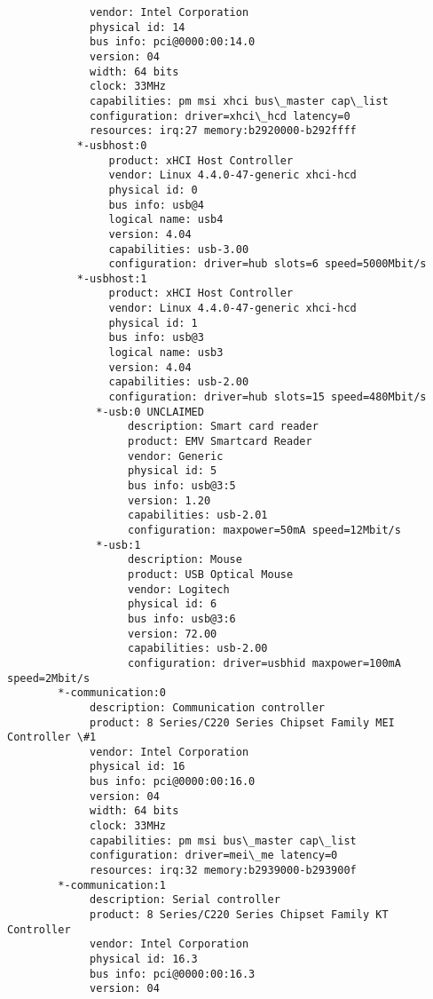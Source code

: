 \begin{verbatim}
             vendor: Intel Corporation
             physical id: 14
             bus info: pci@0000:00:14.0
             version: 04
             width: 64 bits
             clock: 33MHz
             capabilities: pm msi xhci bus\_master cap\_list
             configuration: driver=xhci\_hcd latency=0
             resources: irq:27 memory:b2920000-b292ffff
           *-usbhost:0
                product: xHCI Host Controller
                vendor: Linux 4.4.0-47-generic xhci-hcd
                physical id: 0
                bus info: usb@4
                logical name: usb4
                version: 4.04
                capabilities: usb-3.00
                configuration: driver=hub slots=6 speed=5000Mbit/s
           *-usbhost:1
                product: xHCI Host Controller
                vendor: Linux 4.4.0-47-generic xhci-hcd
                physical id: 1
                bus info: usb@3
                logical name: usb3
                version: 4.04
                capabilities: usb-2.00
                configuration: driver=hub slots=15 speed=480Mbit/s
              *-usb:0 UNCLAIMED
                   description: Smart card reader
                   product: EMV Smartcard Reader
                   vendor: Generic
                   physical id: 5
                   bus info: usb@3:5
                   version: 1.20
                   capabilities: usb-2.01
                   configuration: maxpower=50mA speed=12Mbit/s
              *-usb:1
                   description: Mouse
                   product: USB Optical Mouse
                   vendor: Logitech
                   physical id: 6
                   bus info: usb@3:6
                   version: 72.00
                   capabilities: usb-2.00
                   configuration: driver=usbhid maxpower=100mA speed=2Mbit/s
        *-communication:0
             description: Communication controller
             product: 8 Series/C220 Series Chipset Family MEI Controller \#1
             vendor: Intel Corporation
             physical id: 16
             bus info: pci@0000:00:16.0
             version: 04
             width: 64 bits
             clock: 33MHz
             capabilities: pm msi bus\_master cap\_list
             configuration: driver=mei\_me latency=0
             resources: irq:32 memory:b2939000-b293900f
        *-communication:1
             description: Serial controller
             product: 8 Series/C220 Series Chipset Family KT Controller
             vendor: Intel Corporation
             physical id: 16.3
             bus info: pci@0000:00:16.3
             version: 04

\end{verbatim}
